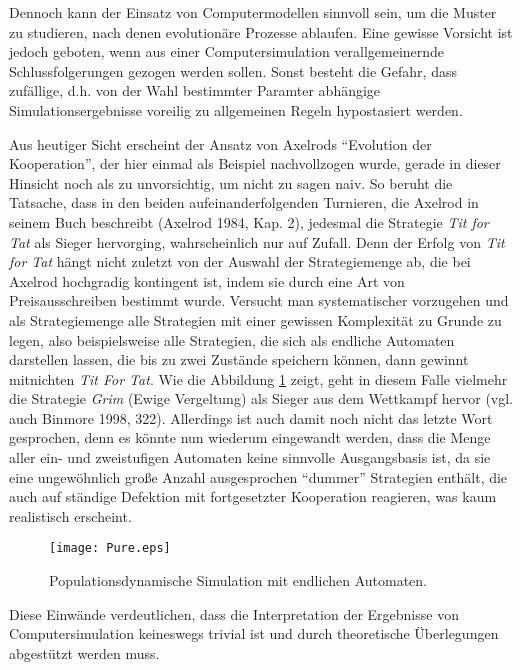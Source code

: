 \documentclass[12pt,a4paper,ngerman]{article}
\begin{document}
Dennoch kann der Einsatz von Computermodellen sinnvoll sein, um die
Muster zu studieren, nach denen evolutionäre Prozesse ablaufen. Eine
gewisse Vorsicht ist jedoch geboten, wenn aus einer Computersimulation
verallgemeinernde Schlussfolgerungen gezogen werden sollen. Sonst
besteht die Gefahr, dass zufällige, d.h. von der Wahl bestimmter
Paramter abhängige Simulationsergebnisse voreilig zu allgemeinen
Regeln hypostasiert werden.

Aus heutiger Sicht erscheint der Ansatz von Axelrods "`Evolution der
Kooperation"', der hier einmal als Beispiel nachvollzogen wurde,
gerade in dieser Hinsicht noch als zu unvorsichtig, um nicht zu sagen
naiv. So beruht die Tatsache, dass in den beiden aufeinanderfolgenden
Turnieren, die Axelrod in seinem Buch beschreibt (Axelrod 1984,
Kap. 2), jedesmal die Strategie {\em Tit for Tat} als Sieger
hervorging, wahrscheinlich nur auf Zufall. Denn der Erfolg von {\em
  Tit for Tat} hängt nicht zuletzt von der Auswahl der Strategiemenge
ab, die bei Axelrod hochgradig kontingent ist, indem sie durch eine
Art von Preisausschreiben bestimmt wurde. Versucht man systematischer
vorzugehen und als Strategiemenge alle Strategien mit einer gewissen
Komplexität zu Grunde zu legen, also beispielsweise alle Strategien,
die sich als endliche Automaten darstellen lassen, die bis zu zwei
Zustände speichern können, dann gewinnt mitnichten {\em Tit For
  Tat}. Wie die Abbildung \ref{Pure} zeigt, geht in diesem Falle
vielmehr die Strategie {\em Grim} (Ewige Vergeltung) als Sieger aus
dem Wettkampf hervor (vgl. auch Binmore 1998, 322). Allerdings ist
auch damit noch nicht das letzte Wort gesprochen, denn es könnte nun
wiederum eingewandt werden, dass die Menge aller ein- und zweistufigen
Automaten keine sinnvolle Ausgangsbasis ist, da sie eine ungewöhnlich
große Anzahl ausgesprochen "`dummer"' Strategien enthält, die auch auf
ständige Defektion mit fortgesetzter Kooperation reagieren, was kaum
realistisch erscheint.

\begin{figure}
\begin{center}
\texttt{[image: Pure.eps]}
\caption{\label{Pure} {\small Populationsdynamische Simulation mit endlichen Automaten.}}
\end{center}
\end{figure}

Diese Einwände verdeutlichen, dass die Interpretation der Ergebnisse
von Computersimulation keineswegs trivial ist und durch theoretische
Überlegungen abgestützt werden muss.
\end{document}
